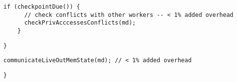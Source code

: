   \begin{lstlisting}[morekeywords={pathcost}, aboveskip=0pt,belowskip=0pt,backgroundcolor=\color{lightgray},
  firstnumber=auto, name=dij_checks]
    if (checkpointDue()) {
      // check conflicts with other workers -- < 1% added overhead
      checkPrivAcccessesConflicts(md);
    }
  \end{lstlisting}

\begin{lstlisting}[morekeywords={pathcost}, aboveskip=0pt, belowskip=0pt, firstnumber=auto,name=dij_checks]
  }
    \end{lstlisting}

  \begin{lstlisting}[morekeywords={pathcost}, aboveskip=0pt,belowskip=0pt,backgroundcolor=\color{lightgray},
  firstnumber=auto, name=dij_checks]
  communicateLiveOutMemState(md); // < 1% added overhead
  \end{lstlisting}

\begin{lstlisting}[morekeywords={pathcost}, aboveskip=0pt, belowskip=0pt,
firstnumber=auto,name=dij_checks]
}
\end{lstlisting}

